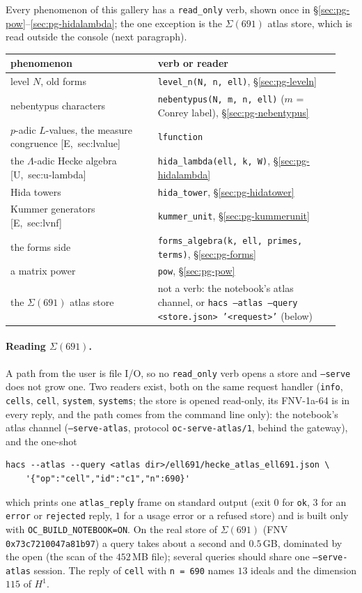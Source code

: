 \documentclass[11pt]{article}
\newcommand{\code}[1]{\texttt{#1}}
\begin{document}
Every phenomenon of this gallery has a \code{read\_only} verb, shown once in \S\ref{sec:pg-pow}--\ref{sec:pg-hidalambda}; the one exception is
the $\Sigma(691)$ atlas store, which is read outside the console (next paragraph).
\begin{center}\small
\begin{tabular}{@{}>{\raggedright}p{0.42\linewidth}>{\raggedright\arraybackslash}p{0.52\linewidth}@{}}
\toprule
phenomenon & verb or reader \\
\midrule
level $N$, old forms & \code{level\_n(N, n, ell)}, \S\ref{sec:pg-leveln} \\
nebentypus characters & \code{nebentypus(N, m, n, ell)} ($m$ = Conrey label), \S\ref{sec:pg-nebentypus} \\
$p$-adic $L$-values, the measure congruence [E,~sec:lvalue] & \code{lfunction} \\
the $\Lambda$-adic Hecke algebra [U,~sec:u-lambda] & \code{hida\_lambda(ell, k, W)}, \S\ref{sec:pg-hidalambda} \\
Hida towers & \code{hida\_tower}, \S\ref{sec:pg-hidatower} \\
Kummer generators [E,~sec:lvnf] & \code{kummer\_unit}, \S\ref{sec:pg-kummerunit} \\
the forms side & \code{forms\_algebra(k, ell, primes, terms)}, \S\ref{sec:pg-forms} \\
a matrix power & \code{pow}, \S\ref{sec:pg-pow} \\
the $\Sigma(691)$ atlas store & not a verb: the notebook's atlas channel, or \code{hacs --atlas --query <store.json> '<request>'} (below) \\
\bottomrule
\end{tabular}
\end{center}
\paragraph{Reading $\Sigma(691)$.} A path from the user is file I/O, so no \code{read\_only} verb opens a store and \code{--serve} does not grow one. Two readers exist,
both on the same request handler (\code{info}, \code{cells}, \code{cell}, \code{system}, \code{systems}; the store is opened read-only, its FNV-1a-64 is in every reply, and the
path comes from the command line only): the notebook's atlas channel (\code{--serve-atlas}, protocol \code{oc-serve-atlas/1}, behind the gateway), and the one-shot
\begin{Verbatim}[fontsize=\small]
hacs --atlas --query <atlas dir>/ell691/hecke_atlas_ell691.json \
    '{"op":"cell","id":"c1","n":690}'
\end{Verbatim}
which prints one \code{atlas\_reply} frame on standard output (exit $0$ for \code{ok}, $3$ for an \code{error} or \code{rejected} reply, $1$ for a usage error or a refused store) and is
built only with \code{OC\_BUILD\_NOTEBOOK=ON}. On the real store of $\Sigma(691)$ (FNV \code{0x73c7210047a81b97}) a query takes about a second and $0.5$\,GB, dominated by the
open (the scan of the $452$\,MB file); several queries should share one \code{--serve-atlas} session. The reply of \code{cell} with \code{n = 690} names $13$ ideals and the dimension $115$ of $H^{1}$.
\end{document}
